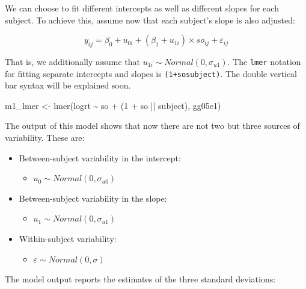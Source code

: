 \documentclass[
  12pt,
]{krantz}
\newenvironment{Shaded}{\begin{snugshade}}{\end{snugshade}}
\newcommand{\DecValTok}[1]{\textcolor[rgb]{0.00,0.00,0.81}{#1}}
\newcommand{\FunctionTok}[1]{\textcolor[rgb]{0.00,0.00,0.00}{#1}}
\newcommand{\NormalTok}[1]{#1}
\newcommand{\OtherTok}[1]{\textcolor[rgb]{0.56,0.35,0.01}{#1}}
\newcommand{\SpecialCharTok}[1]{\textcolor[rgb]{0.00,0.00,0.00}{#1}}
\providecommand{\tightlist}{%
  \setlength{\itemsep}{0pt}\setlength{\parskip}{0pt}}
\theoremstyle{definition}
\theoremstyle{definition}
\theoremstyle{definition}
\theoremstyle{definition}
\theoremstyle{remark}
\begin{document}
We can choose to fit different intercepts as well as different slopes for each subject. To achieve this, assume now that each subject's slope is also adjusted:

\begin{equation}
y_{ij} = \beta_0 + u_{0i}+(\beta_1+u_{1i})\times so_{ij} + \varepsilon_{ij}
\end{equation}

That is, we additionally assume that \(u_{1i} \sim Normal(0,\sigma_{u1})\). The \texttt{lmer} notation for fitting separate intercepts and slopes is \texttt{(1+so\textbar{}\textbar{}subject)}. The double vertical bar syntax will be explained soon.

\begin{Shaded}
\begin{Highlighting}[]
\NormalTok{m1\_lmer }\OtherTok{\textless{}{-}} \FunctionTok{lmer}\NormalTok{(logrt }\SpecialCharTok{\textasciitilde{}}\NormalTok{ so }\SpecialCharTok{+}\NormalTok{ (}\DecValTok{1} \SpecialCharTok{+}\NormalTok{ so }\SpecialCharTok{||}\NormalTok{ subject), gg05e1)}
\end{Highlighting}
\end{Shaded}

The output of this model shows that now there are not two but three sources of variability. These are:

\begin{itemize}
\tightlist
\item
  Between-subject variability in the intercept:

  \begin{itemize}
  \tightlist
  \item
    \(u_0 \sim Normal(0,\sigma_{u0})\)
  \end{itemize}
\item
  Between-subject variability in the slope:

  \begin{itemize}
  \tightlist
  \item
    \(u_1 \sim Normal(0,\sigma_{u1})\)
  \end{itemize}
\item
  Within-subject variability:

  \begin{itemize}
  \tightlist
  \item
    \(\varepsilon \sim Normal(0,\sigma)\)
  \end{itemize}
\end{itemize}

The model output reports the estimates of the three standard deviations:
\end{document}
